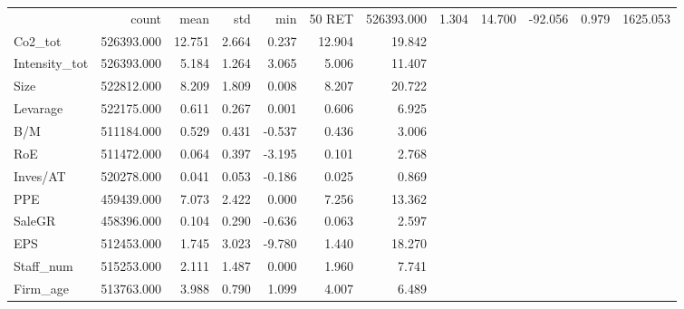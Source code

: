 \begin{tabular}{lrrrrrr}
\toprule
 & count & mean & std & min & 50%
\midrule
RET & 526393.000 & 1.304 & 14.700 & -92.056 & 0.979 & 1625.053 \\
Co2_tot & 526393.000 & 12.751 & 2.664 & 0.237 & 12.904 & 19.842 \\
Intensity_tot & 526393.000 & 5.184 & 1.264 & 3.065 & 5.006 & 11.407 \\
Size & 522812.000 & 8.209 & 1.809 & 0.008 & 8.207 & 20.722 \\
Levarage & 522175.000 & 0.611 & 0.267 & 0.001 & 0.606 & 6.925 \\
B/M & 511184.000 & 0.529 & 0.431 & -0.537 & 0.436 & 3.006 \\
RoE & 511472.000 & 0.064 & 0.397 & -3.195 & 0.101 & 2.768 \\
Inves/AT & 520278.000 & 0.041 & 0.053 & -0.186 & 0.025 & 0.869 \\
PPE & 459439.000 & 7.073 & 2.422 & 0.000 & 7.256 & 13.362 \\
SaleGR & 458396.000 & 0.104 & 0.290 & -0.636 & 0.063 & 2.597 \\
EPS & 512453.000 & 1.745 & 3.023 & -9.780 & 1.440 & 18.270 \\
Staff_num & 515253.000 & 2.111 & 1.487 & 0.000 & 1.960 & 7.741 \\
Firm_age & 513763.000 & 3.988 & 0.790 & 1.099 & 4.007 & 6.489 \\
\bottomrule
\end{tabular}
